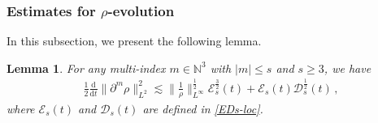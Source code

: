 \documentclass[reqno,11pt]{amsart}
\newtheorem{lemma}{Lemma}[section]
\numberwithin{equation}{section}
\def\d{\mathrm{d}}
\begin{document}
\subsubsection{\bf Estimates for $\rho$-evolution}

In this subsection, we present the following lemma.

\begin{lemma}\label{Lmm-rho-loc}
For any multi-index $m \in \mathbb{N}^3$ with $|m| \leq s$ and $s \geq 3$, we have
    \begin{equation}\label{rho-eq}
        \begin{aligned}
            \tfrac{1}{2} \tfrac{\d}{\d t} \|\partial^{m}\rho\|^{2}_{L^{2}} \lesssim \|\tfrac{1}{\rho}\|^{\tfrac{1}{2}}_{L^\infty} \mathcal{E}_s^\frac{3}{2} (t) + \mathcal{E}_s (t) \mathcal{D}_s^\frac{1}{2} (t) \,,
        \end{aligned}
    \end{equation}
    where $\mathcal{E}_s (t)$ and $\mathcal{D}_s (t)$ are defined in \eqref{EDs-loc}.
\end{lemma}
\end{document}
